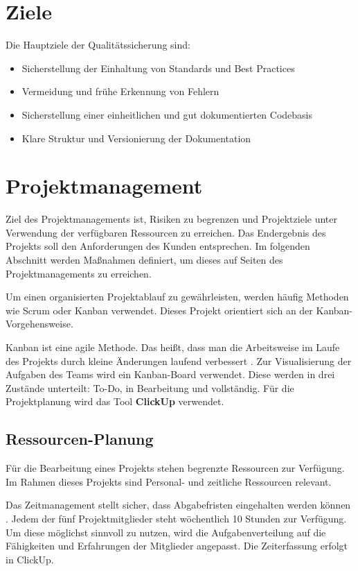 \documentclass[a4paper,12pt]{article}
\begin{document}
\section{Ziele}
Die Hauptziele der Qualitätssicherung sind:
\begin{itemize}
    \item Sicherstellung der Einhaltung von Standards und Best Practices
    \item Vermeidung und frühe Erkennung von Fehlern
    \item Sicherstellung einer einheitlichen und gut dokumentierten Codebasis
    \item Klare Struktur und Versionierung der Dokumentation
\end{itemize}
\newpage

\section{Projektmanagement}
Ziel des Projektmanagements ist, Risiken zu begrenzen und Projektziele unter Verwendung der verfügbaren Ressourcen zu erreichen. Das Endergebnis des Projekts soll den Anforderungen des Kunden entsprechen. Im folgenden Abschnitt werden Maßnahmen definiert, um dieses auf Seiten des Projektmanagements zu erreichen.

Um einen organisierten Projektablauf zu gewährleisten, werden häufig Methoden wie Scrum oder Kanban verwendet. Dieses Projekt orientiert sich an der Kanban-Vorgehensweise.

Kanban ist eine agile Methode. Das heißt, dass man die Arbeitsweise im Laufe des Projekts durch kleine Änderungen laufend verbessert \cite{dechange_agiles_2024}. Zur Visualisierung der Aufgaben des Teams wird ein Kanban-Board verwendet. Diese werden in drei Zustände unterteilt: To-Do, in Bearbeitung und vollständig. Für die Projektplanung wird das Tool \textbf{ClickUp} verwendet. 

    \subsection{Ressourcen-Planung} Für die Bearbeitung eines Projekts stehen begrenzte Ressourcen zur Verfügung. Im Rahmen dieses Projekts sind Personal- und zeitliche Ressourcen relevant. 
    
    Das Zeitmanagement stellt sicher, dass Abgabefristen eingehalten werden können \cite{helmold_projektmanagement_2023}. Jedem der fünf Projektmitglieder steht wöchentlich 10 Stunden zur Verfügung. Um diese möglichst sinnvoll zu nutzen, wird die Aufgabenverteilung auf die Fähigkeiten und Erfahrungen der Mitglieder angepasst. Die Zeiterfassung erfolgt in ClickUp.
\end{document}
